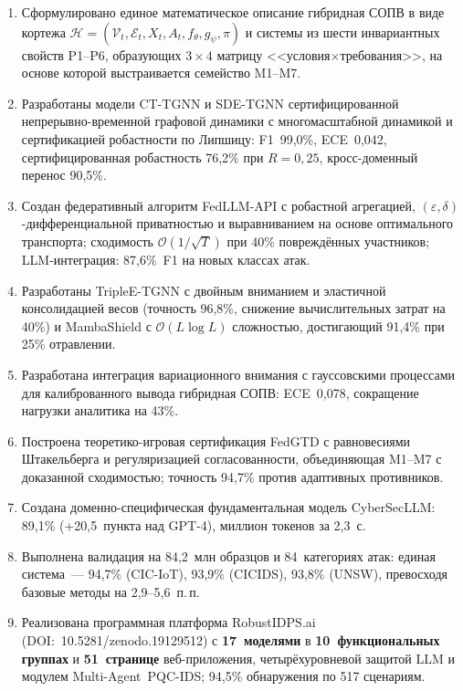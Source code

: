 \documentclass[12pt,a5paper]{article}
\begin{document}
\begin{enumerate}
\item Сформулировано единое математическое описание гибридная СОПВ
в виде кортежа $\mathcal{H} = (\mathcal{V}_t, \mathcal{E}_t,
X_t, A_t, f_\theta, g_\psi, \pi)$ и системы из шести
инвариантных свойств P1--P6, образующих $3\times4$ матрицу
<<условия$\times$требования>>, на основе которой выстраивается
семейство M1--M7.

\item Разработаны модели CT-TGNN и SDE-TGNN сертифицированной
непрерывно-временной графовой динамики с многомасштабной
динамикой и сертификацией робастности по Липшицу:
F1~99,0\%, ECE~0,042, сертифицированная робастность 76,2\%
при $R{=}0{,}25$, кросс-доменный перенос 90,5\%.

\item Создан федеративный алгоритм FedLLM-API с робастной
агрегацией, $(\varepsilon,\delta)$-дифференциальной приватностью
и выравниванием на основе оптимального транспорта; сходимость
$\mathcal{O}(1/\sqrt{T})$ при 40\% повреждённых участников;
LLM-интеграция: 87,6\%~F1 на новых классах атак.

\item Разработаны TripleE-TGNN с двойным вниманием и
эластичной консолидацией весов (точность 96,8\%, снижение
вычислительных затрат на 40\%) и MambaShield с $\mathcal{O}(L\log L)$
сложностью, достигающий 91,4\% при 25\% отравлении.

\item Разработана интеграция вариационного внимания с
гауссовскими процессами для калиброванного вывода
гибридная СОПВ: ECE~0,078, сокращение нагрузки аналитика на
43\%.

\item Построена теоретико-игровая сертификация FedGTD с
равновесиями Штакельберга и регуляризацией согласованности,
объединяющая M1--M7 с доказанной сходимостью; точность
94,7\% против адаптивных противников.

\item Создана доменно-специфическая фундаментальная модель
CyberSecLLM: 89,1\% (+20,5~пункта над GPT-4), миллион токенов
за 2,3~с.

\item Выполнена валидация на 84,2~млн образцов и 84~категориях
атак: единая система~--- 94,7\% (CIC-IoT), 93,9\% (CICIDS),
93,8\% (UNSW), превосходя базовые методы на 2,9--5,6~п.\,п.

\item Реализована программная платформа RobustIDPS.ai
(DOI:~10.5281/zenodo.19129512) с \textbf{17~моделями} в
\textbf{10~функциональных группах} и \textbf{51~странице}
веб-приложения, четырёхуровневой защитой LLM и модулем
Multi-Agent~PQC-IDS; 94,5\% обнаружения по 517 сценариям.


\end{enumerate}
\end{document}
